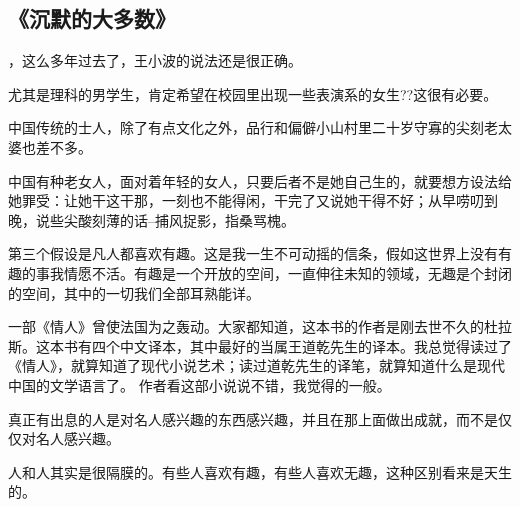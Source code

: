 \subsection{《沉默的大多数》}
，这么多年过去了，王小波的说法还是很正确。

尤其是理科的男学生，肯定希望在校园里出现一些表演系的女生??这很有必要。

中国传统的士人，除了有点文化之外，品行和偏僻小山村里二十岁守寡的尖刻老太婆也差不多。

中国有种老女人，面对着年轻的女人，只要后者不是她自己生的，就要想方设法给她罪受：让她干这干那，一刻也不能得闲，干完了又说她干得不好；从早唠叨到晚，说些尖酸刻薄的话--捕风捉影，指桑骂槐。

第三个假设是凡人都喜欢有趣。这是我一生不可动摇的信条，假如这世界上没有有趣的事我情愿不活。有趣是一个开放的空间，一直伸往未知的领域，无趣是个封闭的空间，其中的一切我们全部耳熟能详。

一部《情人》曾使法国为之轰动。大家都知道，这本书的作者是刚去世不久的杜拉斯。这本书有四个中文译本，其中最好的当属王道乾先生的译本。我总觉得读过了《情人》，就算知道了现代小说艺术；读过道乾先生的译笔，就算知道什么是现代中国的文学语言了。
作者看这部小说说不错，我觉得的一般。

真正有出息的人是对名人感兴趣的东西感兴趣，并且在那上面做出成就，而不是仅仅对名人感兴趣。

人和人其实是很隔膜的。有些人喜欢有趣，有些人喜欢无趣，这种区别看来是天生的。